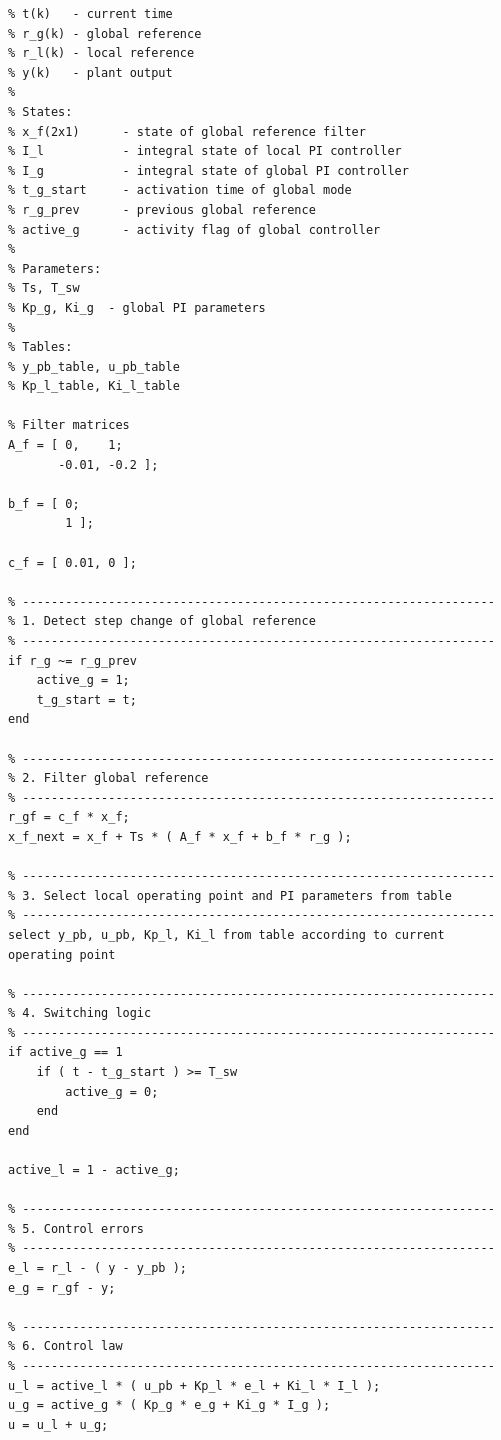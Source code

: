 \begin{lstlisting}[style=pseudocode,
caption={Pseudokód prepínania s globálnou reguláciou po určitý čas},
label={lst:pi_switch_timer_based}]
% Inputs:
% t(k)   - current time
% r_g(k) - global reference
% r_l(k) - local reference
% y(k)   - plant output
%
% States:
% x_f(2x1)      - state of global reference filter
% I_l           - integral state of local PI controller
% I_g           - integral state of global PI controller
% t_g_start     - activation time of global mode
% r_g_prev      - previous global reference
% active_g      - activity flag of global controller
%
% Parameters:
% Ts, T_sw
% Kp_g, Ki_g  - global PI parameters
%
% Tables:
% y_pb_table, u_pb_table
% Kp_l_table, Ki_l_table

% Filter matrices
A_f = [ 0,    1;
       -0.01, -0.2 ];

b_f = [ 0;
        1 ];

c_f = [ 0.01, 0 ];

% ------------------------------------------------------------------
% 1. Detect step change of global reference
% ------------------------------------------------------------------
if r_g ~= r_g_prev
    active_g = 1;
    t_g_start = t;
end

% ------------------------------------------------------------------
% 2. Filter global reference
% ------------------------------------------------------------------
r_gf = c_f * x_f;
x_f_next = x_f + Ts * ( A_f * x_f + b_f * r_g );

% ------------------------------------------------------------------
% 3. Select local operating point and PI parameters from table
% ------------------------------------------------------------------
select y_pb, u_pb, Kp_l, Ki_l from table according to current operating point

% ------------------------------------------------------------------
% 4. Switching logic
% ------------------------------------------------------------------
if active_g == 1
    if ( t - t_g_start ) >= T_sw
        active_g = 0;
    end
end

active_l = 1 - active_g;

% ------------------------------------------------------------------
% 5. Control errors
% ------------------------------------------------------------------
e_l = r_l - ( y - y_pb );
e_g = r_gf - y;

% ------------------------------------------------------------------
% 6. Control law
% ------------------------------------------------------------------
u_l = active_l * ( u_pb + Kp_l * e_l + Ki_l * I_l );
u_g = active_g * ( Kp_g * e_g + Ki_g * I_g );
u = u_l + u_g;


\end{lstlisting}
